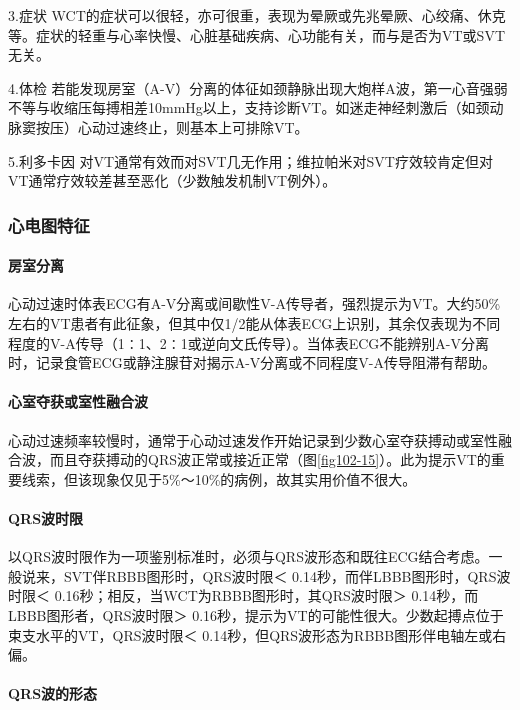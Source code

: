 3.症状
WCT的症状可以很轻，亦可很重，表现为晕厥或先兆晕厥、心绞痛、休克等。症状的轻重与心率快慢、心脏基础疾病、心功能有关，而与是否为VT或SVT无关。

4.体检
若能发现房室（A-V）分离的体征如颈静脉出现大炮样A波，第一心音强弱不等与收缩压每搏相差10mmHg以上，支持诊断VT。如迷走神经刺激后（如颈动脉窦按压）心动过速终止，则基本上可排除VT。

5.利多卡因
对VT通常有效而对SVT几无作用；维拉帕米对SVT疗效较肯定但对VT通常疗效较差甚至恶化（少数触发机制VT例外）。

\subsubsection{心电图特征}

\paragraph{房室分离}

心动过速时体表ECG有A-V分离或间歇性V-A传导者，强烈提示为VT。大约50\%左右的VT患者有此征象，但其中仅1/2能从体表ECG上识别，其余仅表现为不同程度的V-A传导（1∶1、2∶1或逆向文氏传导）。当体表ECG不能辨别A-V分离时，记录食管ECG或静注腺苷对揭示A-V分离或不同程度V-A传导阻滞有帮助。

\paragraph{心室夺获或室性融合波}

心动过速频率较慢时，通常于心动过速发作开始记录到少数心室夺获搏动或室性融合波，而且夺获搏动的QRS波正常或接近正常（图\ref{fig102-15}）。此为提示VT的重要线索，但该现象仅见于5\%～10\%的病例，故其实用价值不很大。

\paragraph{QRS波时限}

以QRS波时限作为一项鉴别标准时，必须与QRS波形态和既往ECG结合考虑。一般说来，SVT伴RBBB图形时，QRS波时限＜
0.14秒，而伴LBBB图形时，QRS波时限＜
0.16秒；相反，当WCT为RBBB图形时，其QRS波时限＞
0.14秒，而LBBB图形者，QRS波时限＞
0.16秒，提示为VT的可能性很大。少数起搏点位于束支水平的VT，QRS波时限＜
0.14秒，但QRS波形态为RBBB图形伴电轴左或右偏。

\paragraph{QRS波的形态}

